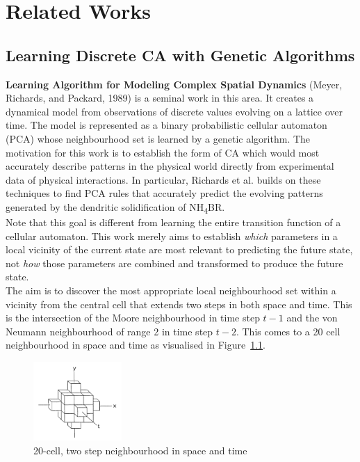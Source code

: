 \chapter{Related Works}

\section{Learning Discrete CA with Genetic Algorithms}

\noindent
\textbf{Learning Algorithm for Modeling Complex Spatial Dynamics} (Meyer, Richards, and Packard, 1989) \cite{meyer1989learning} is a seminal work in this area. It creates a dynamical model from observations of discrete values evolving on a lattice over time. The model is represented as a binary probabilistic cellular automaton (PCA) whose neighbourhood set is learned by a genetic algorithm. The motivation for this work is to establish the form of CA which would most accurately describe patterns in the physical world directly from experimental data of physical interactions. In particular, Richards et al. \cite{richards1990extracting} builds on these techniques to find PCA rules that accurately predict the evolving patterns generated by the dendritic solidification of NH\textsubscript{4}BR.\\

Note that this goal is different from learning the entire transition function of a cellular automaton. This work merely aims to establish \textit{which} parameters in a local vicinity of the current state are most relevant to predicting the future state, not \textit{how} those parameters are combined and transformed to produce the future state.\\

The aim is to discover the most appropriate local neighbourhood set within a vicinity from the central cell that extends two steps in both space and time. This is the intersection of the Moore neighbourhood in time step $t-1$ and the von Neumann neighbourhood of range 2 in time step $t-2$. This comes to a 20 cell neighbourhood in space and time as visualised in Figure~\ref{fig:20-near}.

\begin{figure}[!h]
\centering
\includegraphics[width=0.3\textwidth]{images/20_neighbourhood.png}
\caption{20-cell, two step neighbourhood in space and time}
\label{fig:20-near}
\end{figure}

